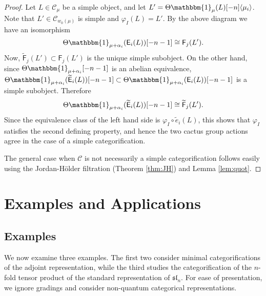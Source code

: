 \documentclass[11pt,reqno]{amsart}
\numberwithin{equation}{section}
\theoremstyle{definition}
\theoremstyle{named}
\newcommand{\cC}{\mathcal{C}}
\newcommand{\sE}{\mathsf{E}}
\newcommand{\sF}{\mathsf{F}}
\renewcommand{\tilde}[1]{\widetilde{#1}}
\newcommand{\sh}[1]{[#1]}
\newcommand{\fsl}{\mathfrak{sl}}
\newcommand{\bone}{\mathbbm{1}}
\begin{document}
\begin{proof}
Let $L\in \cC_\mu$ be a simple object,  and let $L'=\Theta\bone_\mu(L)\sh{-n}\langle \mu_i \rangle$.  Note that $L'\in \cC_{w_0(\mu)}$ is simple and $\varphi_I(L)=L'$.  By the above diagram we have an isomorphism
\begin{align*}
\Theta\bone_{\mu+\alpha_i}(\sE_i(L))\sh{-n-1} \cong \sF_j(L').
\end{align*}
Now, $\widetilde{\sF}_j(L') \subset \sF_j(L')$ is the unique simple subobject.  On the other hand, since $\Theta\bone_{\mu+\alpha_i}\sh{-n-1}$ is an abelian equivalence, $\Theta\bone_{\mu+\alpha_i}(\widetilde{\sE}_i(L))\sh{-n-1}\subset \Theta\bone_{\mu+\alpha_i}(\sE_i(L))\sh{-n-1}$ is a simple subobject.  Therefore
\begin{align*}
\Theta\bone_{\mu+\alpha_i}(\widetilde{\sE}_i(L))\sh{-n-1} \cong \widetilde{\sF}_j(L').
\end{align*}
Since the equivalence class of the left hand side is $\varphi_I\circ \tilde{e}_i(L)$, this shows that $\varphi_I$ satisfies the second defining property, and hence the two cactus group actions agree in the case of a simple categorification. 

The general case when $\cC$ is not necessarily a simple categorification follows easily using the Jordan-H\"older filtration (Theorem \ref{thm:JH}) and Lemma \ref{lem:quot}.
\end{proof}



\section{Examples and Applications}
\subsection{Examples}
We now examine three examples.  The first two consider minimal categorifications of the adjoint representation, while the third studies the categorification of the $n$-fold tensor product of the standard representation of $\fsl_n$.  For ease of presentation, we ignore gradings and consider non-quantum categorical representations.
\end{document}
